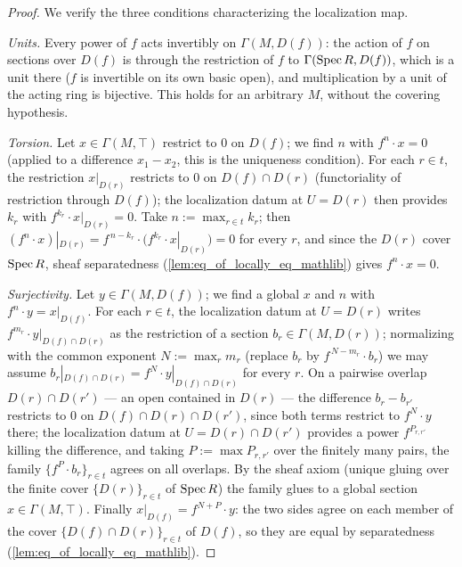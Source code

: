 \begin{proof}
  \leanok
  We verify the three conditions characterizing the localization map.

  \emph{Units.} Every power of \(f\) acts invertibly on \(\Gamma(M, D(f))\): the action
  of \(f\) on sections over \(D(f)\) is through the restriction of \(f\) to
  \(\Gamma(\operatorname{Spec} R, D(f))\), which is a unit there (\(f\) is invertible on its own basic
  open), and multiplication by a unit of the acting ring is bijective. This holds for an
  arbitrary \(M\), without the covering hypothesis.

  \emph{Torsion.} Let \(x \in \Gamma(M, \top)\) restrict to \(0\) on \(D(f)\); we find
  \(n\) with \(f^n \cdot x = 0\) (applied to a difference \(x_1 - x_2\), this is the
  uniqueness condition). For each \(r \in t\), the restriction \(x|_{D(r)}\) restricts to
  \(0\) on \(D(f) \cap D(r)\) (functoriality of restriction through \(D(f)\)); the
  localization datum at \(U = D(r)\) then provides \(k_r\) with
  \(f^{k_r} \cdot x|_{D(r)} = 0\). Take \(n := \max_{r \in t} k_r\); then
  \((f^n \cdot x)|_{D(r)} = f^{\,n-k_r} \cdot \bigl(f^{k_r} \cdot x|_{D(r)}\bigr) = 0\)
  for every \(r\), and since the \(D(r)\) cover \(\operatorname{Spec} R\), sheaf separatedness
  (\cref{lem:eq_of_locally_eq_mathlib}) gives \(f^n \cdot x = 0\).

  \emph{Surjectivity.} Let \(y \in \Gamma(M, D(f))\); we find a global \(x\) and \(n\)
  with \(f^n \cdot y = x|_{D(f)}\). For each \(r \in t\), the localization datum at
  \(U = D(r)\) writes \(f^{m_r} \cdot y|_{D(f) \cap D(r)}\) as the restriction of a
  section \(b_r \in \Gamma(M, D(r))\); normalizing with the common exponent
  \(N := \max_r m_r\) (replace \(b_r\) by \(f^{\,N-m_r} \cdot b_r\)) we may assume
  \(b_r|_{D(f) \cap D(r)} = f^{N} \cdot y|_{D(f) \cap D(r)}\) for every \(r\). On a
  pairwise overlap \(D(r) \cap D(r')\) — an open contained in \(D(r)\) — the difference
  \(b_r - b_{r'}\) restricts to \(0\) on \(D(f) \cap D(r) \cap D(r')\), since both terms
  restrict to \(f^N \cdot y\) there; the localization datum at
  \(U = D(r) \cap D(r')\) provides a power \(f^{P_{r,r'}}\) killing the difference, and
  taking \(P := \max P_{r,r'}\) over the finitely many pairs, the family
  \(\{f^P \cdot b_r\}_{r \in t}\) agrees on all overlaps. By the sheaf axiom (unique
  gluing over the finite cover \(\{D(r)\}_{r \in t}\) of \(\operatorname{Spec} R\)) the family glues to
  a global section \(x \in \Gamma(M, \top)\). Finally
  \(x|_{D(f)} = f^{N+P} \cdot y\): the two sides agree on each member of the cover
  \(\{D(f) \cap D(r)\}_{r \in t}\) of \(D(f)\), so they are equal by separatedness
  (\cref{lem:eq_of_locally_eq_mathlib}).
\end{proof}

